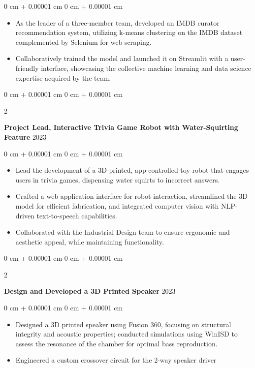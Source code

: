 \documentclass[10pt, letterpaper]{article}
\newenvironment{highlights}{
    \begin{itemize}[
        topsep=0.0 cm,
        parsep=0.0 cm,
        partopsep=0pt,
        itemsep=0pt,
        leftmargin=0 cm + 10pt
    ]
}{
    \end{itemize}
} %
\newenvironment{onecolentry}{
    \begin{adjustwidth}{
        0 cm + 0.00001 cm
    }{
        0 cm + 0.00001 cm
    }
}{
    \end{adjustwidth}
} %
\newenvironment{twocolentry}[2][]{
    \onecolentry
    \def\secondColumn{#2}
    \setcolumnwidth{\fill, 4.5 cm}
    \begin{paracol}{2}
}{
    \switchcolumn \raggedleft \secondColumn
    \end{paracol}
    \endonecolentry
} %
\begin{document}
        \vspace{0.10 cm}
        \begin{onecolentry}
            \begin{highlights}
                \item As the leader of a three-member team, developed an IMDB curator recommendation system, utilizing k-means clustering on the IMDB dataset complemented by Selenium for web scraping.
                \item Collaboratively trained the model and launched it on Streamlit with a user-friendly interface, showcasing the collective machine learning and data science expertise acquired by the team.
            \end{highlights}
        \end{onecolentry}

        \vspace{0.30 cm}
        \begin{twocolentry}{
        }
            \textbf{Project Lead, Interactive Trivia Game Robot with Water-Squirting Feature} 2023\end{twocolentry}

        \vspace{0.10 cm}
        \begin{onecolentry}
            \begin{highlights}
                \item Lead the development of a 3D-printed, app-controlled toy robot that engages users in trivia games, dispensing water squirts to incorrect answers.
                \item Crafted a web application interface for robot interaction, streamlined the 3D model for efficient fabrication, and integrated computer vision with NLP-driven text-to-speech capabilities.
                \item Collaborated with the Industrial Design team to ensure ergonomic and aesthetic appeal, while maintaining functionality.
            \end{highlights}
        \end{onecolentry}

        \vspace{0.30 cm}
        \begin{twocolentry}{
        }
            \textbf{Design and Developed a 3D Printed Speaker} 2023\end{twocolentry}

        \vspace{0.10 cm}
        \begin{onecolentry}
            \begin{highlights}
                \item Designed a 3D printed speaker using Fusion 360, focusing on structural integrity and acoustic properties; conducted simulations using WinISD to assess the resonance of the chamber for optimal bass reproduction.
                \item Engineered a custom crossover circuit for the 2-way speaker driver
            \end{highlights}
        \end{onecolentry}
\end{document}
